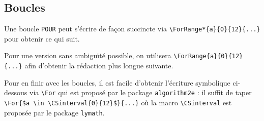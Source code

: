 \documentclass[12pt,a4paper]{article}
\begin{document}

\subsection{Boucles}

Une boucle \verb+POUR+ peut s'écrire de façon succincte via \verb+\ForRange*{a}{0}{12}{...}+ pour obtenir ce qui suit.

\begin{algo}[.55]
\end{algo}


\medskip


Pour une version sans ambiguïté possible, on utilisera \verb+\ForRange{a}{0}{12}{...}+ afin d'obtenir la rédaction plus longue suivante.

\begin{algo}[.55]
\end{algo}


\medskip


Pour en finir avec les boucles, il est facile d'obtenir l'écriture symbolique ci-dessous via \verb+\For+ qui est proposé par le package \verb+algorithm2e+ : il suffit de taper \verb+\For{$a \in \CSinterval{0}{12}$}{...}+ où la macro \verb+\CSinterval+ est proposée par le package \verb+lymath+.

\begin{algo}[.55]
\end{algo}
\end{document}
